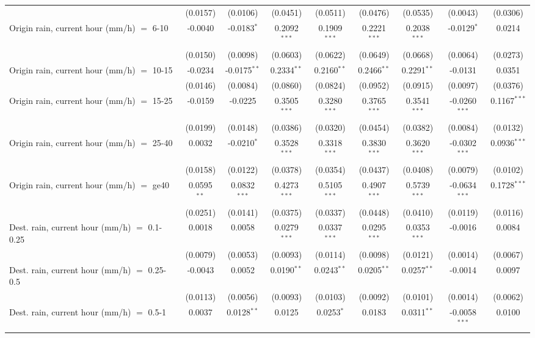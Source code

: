 \begin{tabular}{lcccccccc}
    & (0.0157) & (0.0106) & (0.0451) & (0.0511) & (0.0476) & (0.0535) & (0.0043) & (0.0306)\\
   Origin rain, current hour (mm/h) $=$ 6-10 & -0.0040 & -0.0183$^{*}$ & 0.2092$^{***}$ & 0.1909$^{***}$ & 0.2221$^{***}$ & 0.2038$^{***}$ & -0.0129$^{*}$ & 0.0214\\
    & (0.0150) & (0.0098) & (0.0603) & (0.0622) & (0.0649) & (0.0668) & (0.0064) & (0.0273)\\
   Origin rain, current hour (mm/h) $=$ 10-15 & -0.0234 & -0.0175$^{**}$ & 0.2334$^{**}$ & 0.2160$^{**}$ & 0.2466$^{**}$ & 0.2291$^{**}$ & -0.0131 & 0.0351\\
    & (0.0146) & (0.0084) & (0.0860) & (0.0824) & (0.0952) & (0.0915) & (0.0097) & (0.0376)\\
   Origin rain, current hour (mm/h) $=$ 15-25 & -0.0159 & -0.0225 & 0.3505$^{***}$ & 0.3280$^{***}$ & 0.3765$^{***}$ & 0.3541$^{***}$ & -0.0260$^{***}$ & 0.1167$^{***}$\\
    & (0.0199) & (0.0148) & (0.0386) & (0.0320) & (0.0454) & (0.0382) & (0.0084) & (0.0132)\\
   Origin rain, current hour (mm/h) $=$ 25-40 & 0.0032 & -0.0210$^{*}$ & 0.3528$^{***}$ & 0.3318$^{***}$ & 0.3830$^{***}$ & 0.3620$^{***}$ & -0.0302$^{***}$ & 0.0936$^{***}$\\
    & (0.0158) & (0.0122) & (0.0378) & (0.0354) & (0.0437) & (0.0408) & (0.0079) & (0.0102)\\
   Origin rain, current hour (mm/h) $=$ ge40 & 0.0595$^{**}$ & 0.0832$^{***}$ & 0.4273$^{***}$ & 0.5105$^{***}$ & 0.4907$^{***}$ & 0.5739$^{***}$ & -0.0634$^{***}$ & 0.1728$^{***}$\\
    & (0.0251) & (0.0141) & (0.0375) & (0.0337) & (0.0448) & (0.0410) & (0.0119) & (0.0116)\\
   Dest. rain, current hour (mm/h) $=$ 0.1-0.25 & 0.0018 & 0.0058 & 0.0279$^{***}$ & 0.0337$^{***}$ & 0.0295$^{***}$ & 0.0353$^{***}$ & -0.0016 & 0.0084\\
    & (0.0079) & (0.0053) & (0.0093) & (0.0114) & (0.0098) & (0.0121) & (0.0014) & (0.0067)\\
   Dest. rain, current hour (mm/h) $=$ 0.25-0.5 & -0.0043 & 0.0052 & 0.0190$^{**}$ & 0.0243$^{**}$ & 0.0205$^{**}$ & 0.0257$^{**}$ & -0.0014 & 0.0097\\
    & (0.0113) & (0.0056) & (0.0093) & (0.0103) & (0.0092) & (0.0101) & (0.0014) & (0.0062)\\
   Dest. rain, current hour (mm/h) $=$ 0.5-1 & 0.0037 & 0.0128$^{**}$ & 0.0125 & 0.0253$^{*}$ & 0.0183 & 0.0311$^{**}$ & -0.0058$^{***}$ & 0.0100\\

\end{tabular}
